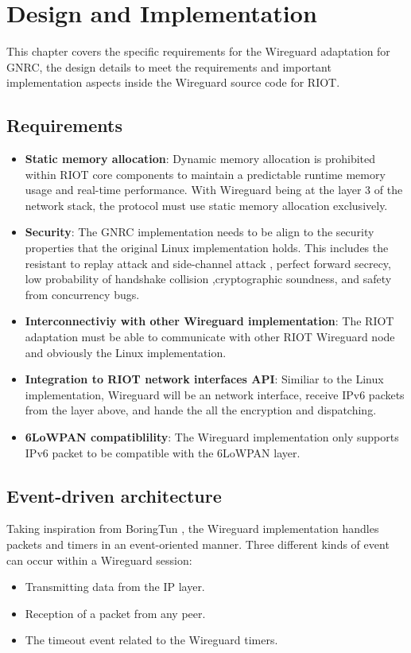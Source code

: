 \chapter{Design and Implementation} \label{chap:des}
This chapter covers the specific requirements for the Wireguard adaptation for GNRC, the design 
details to meet the requirements and important implementation aspects inside the Wireguard source
code for RIOT.
\section{Requirements}
  \begin{itemize}
    \item \textbf{Static memory allocation}: Dynamic memory allocation is prohibited within RIOT core 
    components to maintain a predictable runtime memory usage and real-time performance. With
    Wireguard being at the layer 3 of the network stack, the protocol must use static memory
    allocation exclusively.
    \item \textbf{Security}: The GNRC implementation needs to be align to the security properties that
    the original Linux implementation holds. This includes the resistant to replay attack and
    side-channel attack \cite{side}, perfect forward secrecy, low probability of handshake collision \cite{pwu}
    ,cryptographic soundness, and safety from concurrency bugs.
    \item \textbf{Interconnectiviy with other Wireguard implementation}: The RIOT adaptation must 
    be able to communicate with other RIOT Wireguard node and obviously the Linux implementation.
    \item \textbf{Integration to RIOT network interfaces API}: Similiar to the Linux implementation,
    Wireguard will be an network interface, receive IPv6 packets from the layer above, and
    hande the all the encryption and dispatching.
    \item \textbf{6LoWPAN compatiblility}: The Wireguard implementation only supports IPv6 packet
    to be compatible with the 6LoWPAN layer.
  \end{itemize}
\section{Event-driven architecture}
  Taking inspiration from BoringTun \cite{boringtun}, the Wireguard implementation handles
  packets and timers in an event-oriented manner. Three different kinds of event can occur within
  a Wireguard session:
  \begin{itemize}
    \item Transmitting data from the IP layer.
    \item Reception of a packet from any peer.
    \item The timeout event related to the Wireguard timers.
  \end{itemize}

